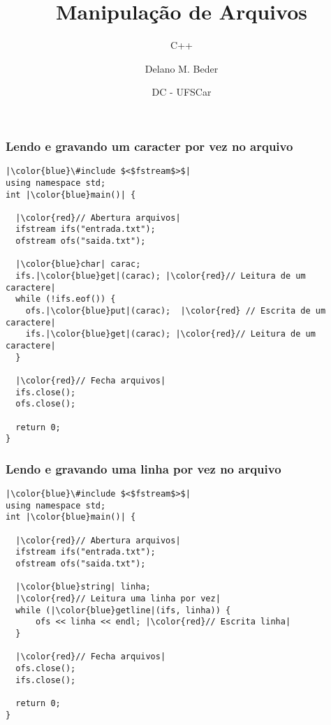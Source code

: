\documentclass{beamer}
\title{Manipulação de Arquivos}
\subtitle{C++}
\author{\Large{Delano M. Beder}}
\date[]{\large{DC - UFSCar}}
\begin{document}
\frame{\titlepage}

\begin{frame}[fragile]

\frametitle{Lendo e gravando um caracter por vez no arquivo}

\begin{lstlisting}
|\color{blue}\#include $<$fstream$>$|
using namespace std;
int |\color{blue}main()| {
    
  |\color{red}// Abertura arquivos|
  ifstream ifs("entrada.txt");
  ofstream ofs("saida.txt");

  |\color{blue}char| carac;
  ifs.|\color{blue}get|(carac); |\color{red}// Leitura de um caractere|
  while (!ifs.eof()) {
    ofs.|\color{blue}put|(carac);  |\color{red} // Escrita de um caractere|
    ifs.|\color{blue}get|(carac); |\color{red}// Leitura de um caractere|
  }

  |\color{red}// Fecha arquivos|
  ifs.close();
  ofs.close();

  return 0;
}
\end{lstlisting}

\end{frame}

\begin{frame}[fragile]

\frametitle{Lendo e gravando uma linha por vez no arquivo}

\begin{lstlisting}
|\color{blue}\#include $<$fstream$>$|
using namespace std;
int |\color{blue}main()| {

  |\color{red}// Abertura arquivos|
  ifstream ifs("entrada.txt");
  ofstream ofs("saida.txt");

  |\color{blue}string| linha;
  |\color{red}// Leitura uma linha por vez|
  while (|\color{blue}getline|(ifs, linha)) {
      ofs << linha << endl; |\color{red}// Escrita linha|
  }

  |\color{red}// Fecha arquivos|
  ofs.close();
  ifs.close();

  return 0;
}
\end{lstlisting}

\end{frame}
\end{document}
